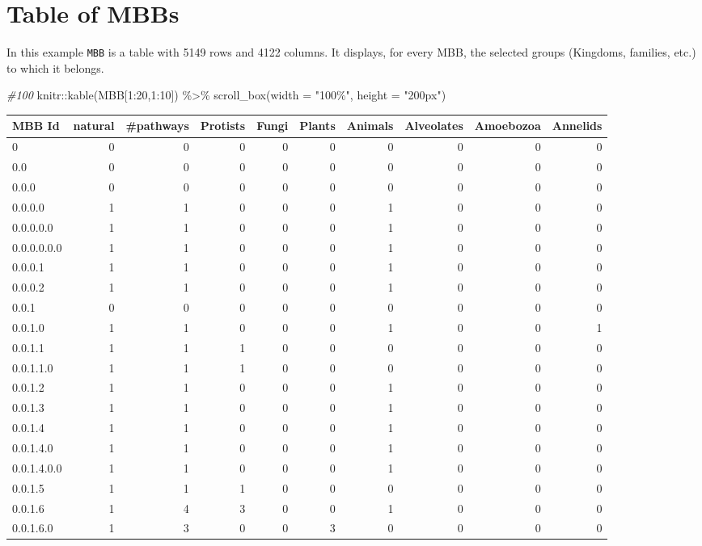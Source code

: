 \documentclass[
  letterpaper,
  DIV=11,
  numbers=noendperiod]{scrreprt}
\newenvironment{Shaded}{}{}
\newcommand{\AttributeTok}[1]{\textcolor[rgb]{0.78,0.47,0.87}{#1}}
\newcommand{\CommentTok}[1]{\textcolor[rgb]{0.36,0.39,0.44}{\textit{#1}}}
\newcommand{\DecValTok}[1]{\textcolor[rgb]{0.82,0.60,0.40}{#1}}
\newcommand{\FunctionTok}[1]{\textcolor[rgb]{0.38,0.69,0.94}{#1}}
\newcommand{\NormalTok}[1]{\textcolor[rgb]{0.67,0.70,0.75}{#1}}
\newcommand{\SpecialCharTok}[1]{\textcolor[rgb]{0.34,0.71,0.76}{#1}}
\newcommand{\StringTok}[1]{\textcolor[rgb]{0.60,0.76,0.47}{#1}}
\begin{document}
\hypertarget{table-of-mbbs}{%
\section{Table of MBBs}\label{table-of-mbbs}}

In this example \texttt{MBB} is a table with 5149 rows and 4122 columns.
It displays, for every MBB, the selected groups (Kingdoms, families,
etc.) to which it belongs.

\begin{Shaded}
\begin{Highlighting}[]
\CommentTok{\#100}
\NormalTok{knitr}\SpecialCharTok{::}\FunctionTok{kable}\NormalTok{(MBB[}\DecValTok{1}\SpecialCharTok{:}\DecValTok{20}\NormalTok{,}\DecValTok{1}\SpecialCharTok{:}\DecValTok{10}\NormalTok{]) }\SpecialCharTok{\%\textgreater{}\%}   
  \FunctionTok{scroll\_box}\NormalTok{(}\AttributeTok{width =} \StringTok{"100\%"}\NormalTok{, }\AttributeTok{height =} \StringTok{"200px"}\NormalTok{)}
\end{Highlighting}
\end{Shaded}

\begin{tabular}{l|r|r|r|r|r|r|r|r|r}
\hline
MBB Id & natural & \#pathways & Protists & Fungi & Plants & Animals & Alveolates & Amoebozoa & Annelids\\
\hline
0 & 0 & 0 & 0 & 0 & 0 & 0 & 0 & 0 & 0\\
\hline
0.0 & 0 & 0 & 0 & 0 & 0 & 0 & 0 & 0 & 0\\
\hline
0.0.0 & 0 & 0 & 0 & 0 & 0 & 0 & 0 & 0 & 0\\
\hline
0.0.0.0 & 1 & 1 & 0 & 0 & 0 & 1 & 0 & 0 & 0\\
\hline
0.0.0.0.0 & 1 & 1 & 0 & 0 & 0 & 1 & 0 & 0 & 0\\
\hline
0.0.0.0.0.0 & 1 & 1 & 0 & 0 & 0 & 1 & 0 & 0 & 0\\
\hline
0.0.0.1 & 1 & 1 & 0 & 0 & 0 & 1 & 0 & 0 & 0\\
\hline
0.0.0.2 & 1 & 1 & 0 & 0 & 0 & 1 & 0 & 0 & 0\\
\hline
0.0.1 & 0 & 0 & 0 & 0 & 0 & 0 & 0 & 0 & 0\\
\hline
0.0.1.0 & 1 & 1 & 0 & 0 & 0 & 1 & 0 & 0 & 1\\
\hline
0.0.1.1 & 1 & 1 & 1 & 0 & 0 & 0 & 0 & 0 & 0\\
\hline
0.0.1.1.0 & 1 & 1 & 1 & 0 & 0 & 0 & 0 & 0 & 0\\
\hline
0.0.1.2 & 1 & 1 & 0 & 0 & 0 & 1 & 0 & 0 & 0\\
\hline
0.0.1.3 & 1 & 1 & 0 & 0 & 0 & 1 & 0 & 0 & 0\\
\hline
0.0.1.4 & 1 & 1 & 0 & 0 & 0 & 1 & 0 & 0 & 0\\
\hline
0.0.1.4.0 & 1 & 1 & 0 & 0 & 0 & 1 & 0 & 0 & 0\\
\hline
0.0.1.4.0.0 & 1 & 1 & 0 & 0 & 0 & 1 & 0 & 0 & 0\\
\hline
0.0.1.5 & 1 & 1 & 1 & 0 & 0 & 0 & 0 & 0 & 0\\
\hline
0.0.1.6 & 1 & 4 & 3 & 0 & 0 & 1 & 0 & 0 & 0\\
\hline
0.0.1.6.0 & 1 & 3 & 0 & 0 & 3 & 0 & 0 & 0 & 0\\
\hline
\end{tabular}
\end{document}

